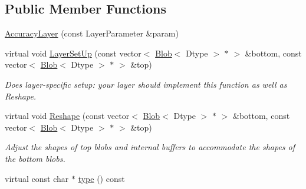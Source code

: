 \subsection*{Public Member Functions}
\begin{DoxyCompactItemize}
\item 
\hyperlink{classcaffe_1_1AccuracyLayer_a362ab61d1961c1b408f84a956f6e598d}{Accuracy\+Layer} (const Layer\+Parameter \&param)
\item 
virtual void \hyperlink{classcaffe_1_1AccuracyLayer_aa4e6baa79f0c23308c39be3fe5085971}{Layer\+Set\+Up} (const vector$<$ \hyperlink{classcaffe_1_1Blob}{Blob}$<$ Dtype $>$ $\ast$ $>$ \&bottom, const vector$<$ \hyperlink{classcaffe_1_1Blob}{Blob}$<$ Dtype $>$ $\ast$ $>$ \&top)
\begin{DoxyCompactList}\small\item\em Does layer-\/specific setup\+: your layer should implement this function as well as Reshape. \end{DoxyCompactList}\item 
virtual void \hyperlink{classcaffe_1_1AccuracyLayer_a28df0e6104cffdc50325a7b4d648dfa5}{Reshape} (const vector$<$ \hyperlink{classcaffe_1_1Blob}{Blob}$<$ Dtype $>$ $\ast$ $>$ \&bottom, const vector$<$ \hyperlink{classcaffe_1_1Blob}{Blob}$<$ Dtype $>$ $\ast$ $>$ \&top)
\begin{DoxyCompactList}\small\item\em Adjust the shapes of top blobs and internal buffers to accommodate the shapes of the bottom blobs. \end{DoxyCompactList}\item 
virtual const char $\ast$ \hyperlink{classcaffe_1_1AccuracyLayer_a57f6e7e7e9567cb17d9e6ae38d372091}{type} () const \hypertarget{classcaffe_1_1AccuracyLayer_a57f6e7e7e9567cb17d9e6ae38d372091}{}\label{classcaffe_1_1AccuracyLayer_a57f6e7e7e9567cb17d9e6ae38d372091}


\end{DoxyCompactItemize}
